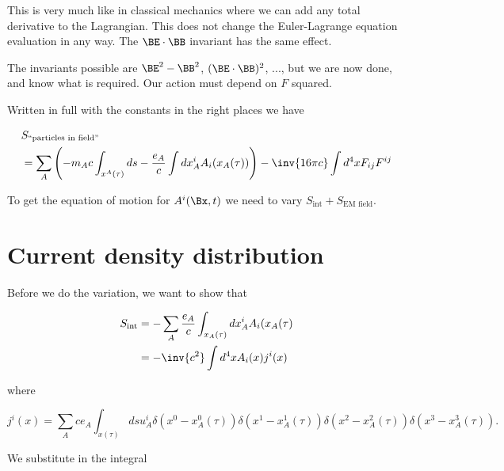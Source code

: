 This is very much like in classical mechanics where we can add any total derivative to the Lagrangian.  This does not change the Euler-Lagrange equation evaluation in any way.  The \(\BE \cdot \BB\) invariant has the same effect.

The invariants possible are \(\BE^2 - \BB^2\), \((\BE \cdot \BB)^2\), ..., but we are now done, and know what is required.  Our action must depend on \(F\) squared.

Written in full with the constants in the right places we have

\begin{equation}\label{eqn:relativisticElectrodynamicsL12b:370}
\begin{aligned}
&S_{\text{``particles in field''}} \\
&= \sum_A \left( -m_A c \int_{x^A(\tau)} ds - \frac{e_A}{c} \int dx^i_A A_i(x_A(\tau))
\right)
- \inv{16 \pi c} \int d^4 x F_{ij} F^{ij}
\end{aligned}
\end{equation}

To get the equation of motion for \(A^i(\Bx, t)\) we need to vary \(S_{\text{int}} + S_{\text{EM field}}\).

\section{Current density distribution}

Before we do the variation, we want to show that

\begin{equation}\label{eqn:relativisticElectrodynamicsL12b:590}
\begin{aligned}
S_{\text{int}} 
&= -\sum_A \frac{e_A}{c} \int_{x_A(\tau)} dx^i_A A_i(x_A(\tau) \\
&= -\inv{c^2} \int d^4 x A_i(x) j^i(x) 
\end{aligned}
\end{equation}

where

\begin{equation}\label{eqn:relativisticElectrodynamicsL12b:390}
j^i(x) = 
\sum_A c e_A \int_{x(\tau)}
ds u^i_A 
\delta(x^0 - x^0_A(\tau))
\delta(x^1 - x^1_A(\tau))
\delta(x^2 - x^2_A(\tau))
\delta(x^3 - x^3_A(\tau)).
\end{equation}

We substitute in the integral

